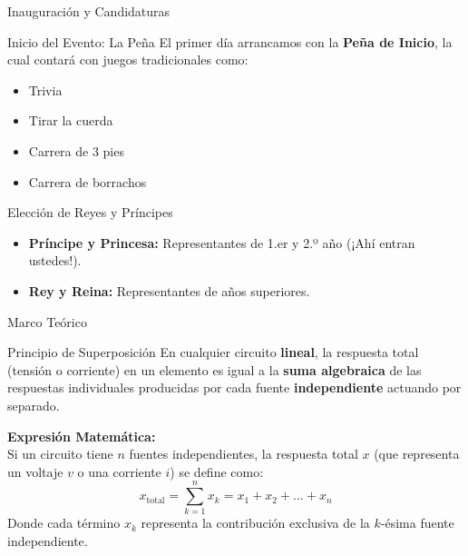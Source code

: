 \documentclass[10pt, aspectratio=169]{beamer}
\begin{document}
\begin{frame}{Inauguración y Candidaturas}
    \begin{boxTeoria}{Inicio del Evento: La Peña}
        El primer día arrancamos con la \textbf{Peña de Inicio}, la cual contará con juegos tradicionales como:
        \begin{itemize}
            \item Trivia
            \item Tirar la cuerda
            \item Carrera de 3 pies
            \item Carrera de borrachos
        \end{itemize}
    \end{boxTeoria}

    \begin{boxTeoria}{Elección de Reyes y Príncipes}
        \begin{itemize}
            \item \textbf{Príncipe y Princesa:} Representantes de 1.er y 2.º año (¡Ahí entran ustedes!).
            \item \textbf{Rey y Reina:} Representantes de años superiores.
        \end{itemize}
    \end{boxTeoria}
\end{frame}

\begin{frame}{Marco Teórico}
    \begin{boxTeoria}{Principio de Superposición}
        En cualquier circuito \textbf{lineal}, la respuesta total (tensión o corriente) en un elemento es igual a la \textbf{suma algebraica} de las respuestas individuales producidas por cada fuente \textbf{independiente} actuando por separado.

        \vspace{0.2cm}
        \textbf{Expresión Matemática:} \\
        Si un circuito tiene $n$ fuentes independientes, la respuesta total $x$ (que representa un voltaje $v$ o una corriente $i$) se define como:
        \begin{equation*}
            x_{\text{total}} = \sum_{k=1}^{n} x_{k} = x_{1} + x_{2} + \dots + x_{n}
        \end{equation*}
        Donde cada término $x_{k}$ representa la contribución exclusiva de la $k$-ésima fuente independiente.
    \end{boxTeoria}
\end{frame}
\end{document}
